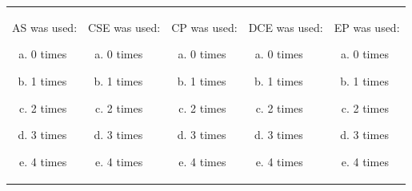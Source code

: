 \documentclass[11pt]{article} %
\begin{document}
\begin{enumerate}
\hspace{10ex}
\begin{tabular}{lllll}
\begin{minipage}{1in}
AS was used:\vspace{-3.5ex}
\newline
\begin{enumerate}[(a)]
\item 0 times
\item 1 times
\item 2 times
\item 3 times
\item 4 times
\end{enumerate}
\end{minipage}
&
\begin{minipage}{1in}
CSE was used:\vspace{-3.5ex}
\newline
\begin{enumerate}[(a)]
\item 0 times
\item 1 times
\item 2 times
\item 3 times
\item 4 times
\end{enumerate}
\end{minipage}
&
\begin{minipage}{1in}
CP was used:\vspace{-3.5ex}
\newline
\begin{enumerate}[(a)]
\item 0 times
\item 1 times
\item 2 times
\item 3 times
\item 4 times
\end{enumerate}
\end{minipage}
&
\begin{minipage}{1in}
DCE was used:\vspace{-3.5ex}
\newline
\begin{enumerate}[(a)]
\item 0 times
\item 1 times
\item 2 times
\item 3 times
\item 4 times
\end{enumerate}
\end{minipage}
&
\begin{minipage}{1in}
EP was used:\vspace{-3.5ex}
\newline
\begin{enumerate}[(a)]
\item 0 times
\item 1 times
\item 2 times
\item 3 times
\item 4 times
\end{enumerate}
\end{minipage}
\end{tabular}



\end{enumerate}
\end{document}
